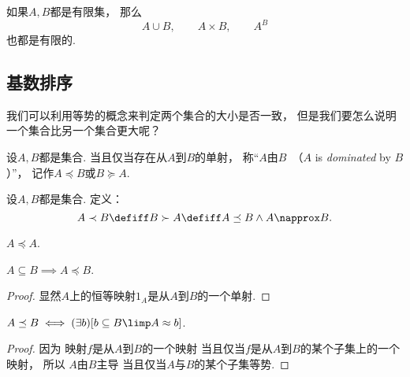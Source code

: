 \begin{theorem}
如果\(A,B\)都是有限集，
那么\begin{equation*}
	A \cup B, \qquad
	A \times B, \qquad
	A^B
\end{equation*}也都是有限的.
\end{theorem}

\subsection{基数排序}
我们可以利用等势的概念来判定两个集合的大小是否一致，
但是我们要怎么说明一个集合比另一个集合更大呢？

\begin{definition}
设\(A,B\)都是集合.
当且仅当存在从\(A\)到\(B\)的单射，
称“\(A\)由\(B\)~（\(A\) is \emph{dominated} by \(B\)）”，
记作\(A \preceq B\)或\(B \succeq A\).
\end{definition}

\begin{definition}
设\(A,B\)都是集合.
定义：\begin{equation*}
	A \prec B
	\defiff
	B \succ A
	\defiff
	A \preceq B \land A \napprox B.
\end{equation*}
\end{definition}

\begin{example}
\(A \preceq A\).
\end{example}

\begin{example}
\(A \subseteq B \implies A \preceq B\).
\begin{proof}
显然\(A\)上的恒等映射\(1_A\)是从\(A\)到\(B\)的一个单射.
\end{proof}
\end{example}

\begin{theorem}\label{theorem:集合论.基数.集合主导关系的等价定义}
\(
	A \preceq B
	\iff
	(\exists b)[b \subseteq B \limp A \approx b]
\).
\begin{proof}
因为
	映射\(f\)是从\(A\)到\(B\)的一个映射
	当且仅当\(f\)是从\(A\)到\(B\)的某个子集上的一个映射，
所以
	\(A\)由\(B\)主导
	当且仅当\(A\)与\(B\)的某个子集等势.
\end{proof}
\end{theorem}

